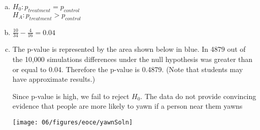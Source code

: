 {{\begin{enumerate}[(a)]
\end{enumerate}
}
{
\begin{enumerate}[(a)]
\setlength{\itemsep}{0mm}
\item $H_0: p_{treatment} = p_{control}$ \\
$H_A: p_{treatment} > p_{control}$
\item $\frac{10}{34} - \frac{4}{16} = 0.04$
\item The p-value is represented by the area shown below in blue. In 4879 out of the 10,000 simulations differences under the null hypothesis was greater than or equal to 0.04. Therefore the p-value is 0.4879. (Note that students may have approximate results.) \\
\noindent \begin{minipage}[c]{0.5\textwidth}
Since p-value is high, we fail to reject $H_0$. The data do not provide convincing evidence that people are more likely to yawn if a person near them yawns
\end{minipage}
\begin{minipage}[c]{0.5\textwidth}
\begin{center}
\texttt{[image: 06/figures/eoce/yawnSoln]}
\end{center}
\end{minipage}
\end{enumerate}
}
}




%
%	
